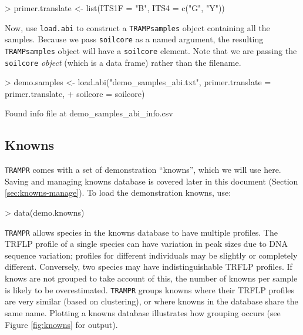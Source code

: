 \documentclass[a4paper]{article}
\newcommand\code\texttt
\begin{document}
\begin{Schunk}
\begin{Sinput}
> primer.translate <- list(ITS1F = "B", ITS4 = c("G", "Y"))
\end{Sinput}
\end{Schunk}

Now, use \code{load.abi} to construct a \code{TRAMPsamples} object
containing all the samples.  Because we pass \code{soilcore} as a
named argument, the resulting \code{TRAMPsamples} object will have a
\code{soilcore} element.  Note that we are passing the \code{soilcore}
\emph{object} (which is a data frame) rather than the filename.

\begin{Schunk}
\begin{Sinput}
> demo.samples <- load.abi("demo_samples_abi.txt", primer.translate = primer.translate, 
+     soilcore = soilcore)
\end{Sinput}
\begin{Soutput}
Found info file at demo_samples_abi_info.csv
\end{Soutput}
\end{Schunk}

\subsection{Knowns}

\code{TRAMPR} comes with a set of demonstration ``knowns'', which we
will use here.  Saving and managing knowns database is covered later
in this document (Section \ref{sec:knowns-manage}).  To load the
demonstration knowns, use:

\begin{Schunk}
\begin{Sinput}
> data(demo.knowns)
\end{Sinput}
\end{Schunk}

\code{TRAMPR} allows species in the knowns database to have multiple
profiles.  The TRFLP profile of a single species can have variation in
peak sizes due to DNA sequence variation; profiles for different
individuals may be slightly or completely different.  Conversely, two
species may have indistinguishable TRFLP profiles.  If knows are not
grouped to take account of this, the number of knowns per sample is
likely to be overestimated.  \code{TRAMPR} groups knowns where their
TRFLP profiles are very similar (based on clustering), or where knowns
in the database share the same name.  Plotting a knowns database
illustrates how grouping occurs (see Figure \ref{fig:knowns} for
output).
\end{document}
